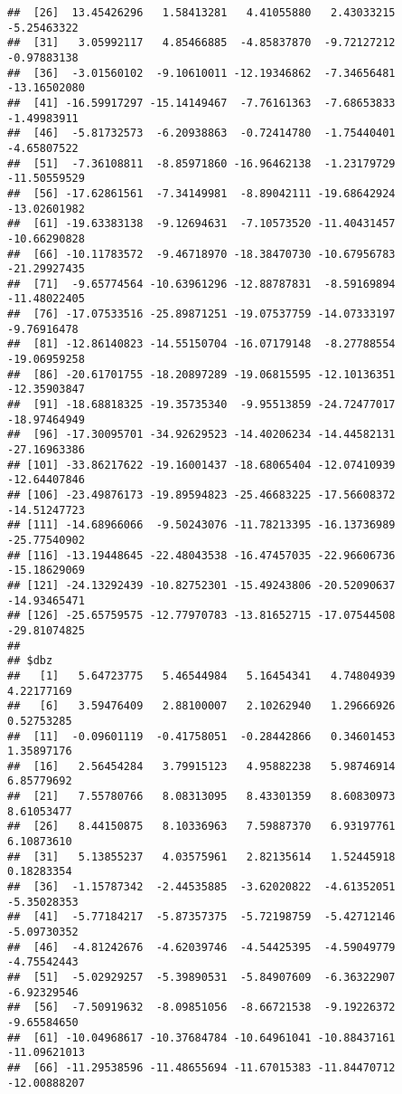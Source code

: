 \documentclass[]{article}
\begin{document}
\begin{verbatim}
##  [26]  13.45426296   1.58413281   4.41055880   2.43033215  -5.25463322
##  [31]   3.05992117   4.85466885  -4.85837870  -9.72127212  -0.97883138
##  [36]  -3.01560102  -9.10610011 -12.19346862  -7.34656481 -13.16502080
##  [41] -16.59917297 -15.14149467  -7.76161363  -7.68653833  -1.49983911
##  [46]  -5.81732573  -6.20938863  -0.72414780  -1.75440401  -4.65807522
##  [51]  -7.36108811  -8.85971860 -16.96462138  -1.23179729 -11.50559529
##  [56] -17.62861561  -7.34149981  -8.89042111 -19.68642924 -13.02601982
##  [61] -19.63383138  -9.12694631  -7.10573520 -11.40431457 -10.66290828
##  [66] -10.11783572  -9.46718970 -18.38470730 -10.67956783 -21.29927435
##  [71]  -9.65774564 -10.63961296 -12.88787831  -8.59169894 -11.48022405
##  [76] -17.07533516 -25.89871251 -19.07537759 -14.07333197  -9.76916478
##  [81] -12.86140823 -14.55150704 -16.07179148  -8.27788554 -19.06959258
##  [86] -20.61701755 -18.20897289 -19.06815595 -12.10136351 -12.35903847
##  [91] -18.68818325 -19.35735340  -9.95513859 -24.72477017 -18.97464949
##  [96] -17.30095701 -34.92629523 -14.40206234 -14.44582131 -27.16963386
## [101] -33.86217622 -19.16001437 -18.68065404 -12.07410939 -12.64407846
## [106] -23.49876173 -19.89594823 -25.46683225 -17.56608372 -14.51247723
## [111] -14.68966066  -9.50243076 -11.78213395 -16.13736989 -25.77540902
## [116] -13.19448645 -22.48043538 -16.47457035 -22.96606736 -15.18629069
## [121] -24.13292439 -10.82752301 -15.49243806 -20.52090637 -14.93465471
## [126] -25.65759575 -12.77970783 -13.81652715 -17.07544508 -29.81074825
## 
## $dbz
##   [1]   5.64723775   5.46544984   5.16454341   4.74804939   4.22177169
##   [6]   3.59476409   2.88100007   2.10262940   1.29666926   0.52753285
##  [11]  -0.09601119  -0.41758051  -0.28442866   0.34601453   1.35897176
##  [16]   2.56454284   3.79915123   4.95882238   5.98746914   6.85779692
##  [21]   7.55780766   8.08313095   8.43301359   8.60830973   8.61053477
##  [26]   8.44150875   8.10336963   7.59887370   6.93197761   6.10873610
##  [31]   5.13855237   4.03575961   2.82135614   1.52445918   0.18283354
##  [36]  -1.15787342  -2.44535885  -3.62020822  -4.61352051  -5.35028353
##  [41]  -5.77184217  -5.87357375  -5.72198759  -5.42712146  -5.09730352
##  [46]  -4.81242676  -4.62039746  -4.54425395  -4.59049779  -4.75542443
##  [51]  -5.02929257  -5.39890531  -5.84907609  -6.36322907  -6.92329546
##  [56]  -7.50919632  -8.09851056  -8.66721538  -9.19226372  -9.65584650
##  [61] -10.04968617 -10.37684784 -10.64961041 -10.88437161 -11.09621013
##  [66] -11.29538596 -11.48655694 -11.67015383 -11.84470712 -12.00888207

\end{verbatim}
\end{document}
